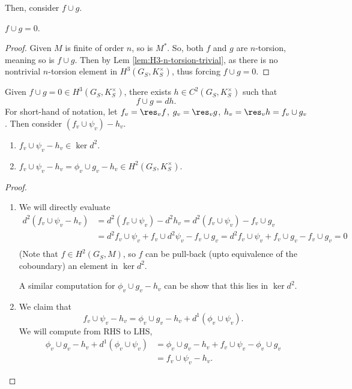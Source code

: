 \documentclass[11pt]{article}
\begin{document}
\bigskip
Then, consider $f \cup g$.
\begin{claim}
    $f \cup g = 0$.
\end{claim}

\begin{proof}
Given $M$ is finite of order $n$, so is $M^*$. So, both $f$ and $g$ are $n$-torsion, meaning so is $f \cup g$. Then by Lem \ref{lem:H3-n-torsion-trivial}, as there is no nontrivial $n$-torsion element in $H^3 (G_S, K_S^\times)$, thus forcing $f \cup g = 0$.
\end{proof}

\bigskip
Given $f \cup g = 0 \in H^3 (G_S, K_S^\times)$, there exists $h \in C^2 (G_S, K_S^\times)$ such that
\[
f \cup g = d h.
\]
For short-hand of notation, let $f_v = \res_v f$, $g_v = \res_v g$, $h_v = \res_v h = f_v \cup g_v$. Then consider $(f_v \cup \psi_v) - h_v$.
\begin{claim}
    \begin{enumerate}
        \item $f_v \cup \psi_v - h_v \in \ker d^2$.
        \item $f_v \cup \psi_v -h_v = \phi_v \cup g_v - h_v \in H^2 (G_S, K_S^\times)$.
    \end{enumerate}
\end{claim}
\begin{proof}
\begin{enumerate}
    \item We will directly evaluate
    \begin{align*}
    d^2 (f_v \cup \psi_v - h_v) & = d^2 (f_v \cup \psi_v) - d^2 h_v = d^2 (f_v \cup \psi_v) - f_v \cup g_v \\
    & = d^2 f_v \cup \psi_v + f_v \cup d^2 \psi_v - f_v \cup g_v = d^2 f_v \cup \psi_v + f_v \cup g_v  - f_v \cup g_v = 0 \\
    \end{align*}
    (Note that $f \in H^2 (G_S, M)$, so $f$ can be pull-back (upto equivalence of the coboundary) an element in $\ker d^2$.

    \bigskip
    A similar computation for $\phi_v \cup g_v - h_v$ can be show that this lies in $\ker d^2$.

    \bigskip
    \item We claim that
    \[
        f_v \cup \psi_v - h_v = \phi_v \cup g_v - h_v + d^1 (\phi_v \cup \psi_v).
    \]
    We will compute from RHS to LHS,
    \begin{align}
    \phi_v \cup g_v - h_v + d^1 (\phi_v \cup \psi_v) & = \phi_v \cup g_v - h_v + f_v \cup \psi_v -\phi_v \cup g_v \\
    & = f_v \cup \psi_v - h_v.
    \end{align}
\end{enumerate}


\end{proof}
\end{document}
